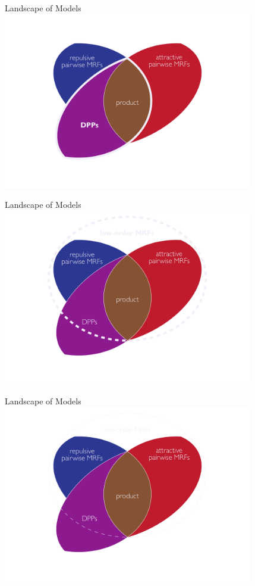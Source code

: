 \begin{frame}{Landscape of Models}
\vspace{0.5em}
\centering
\includegraphics[width=4.3in]{figures/venn04.pdf}
\end{frame}

\begin{frame}{Landscape of Models}
\vspace{0.5em}
\centering
\includegraphics[width=4.3in]{figures/venn05.pdf}
\end{frame}

\begin{frame}{Landscape of Models}
\vspace{0.5em}
\centering
\includegraphics[width=4.3in]{figures/venn05a.pdf}
\end{frame}


